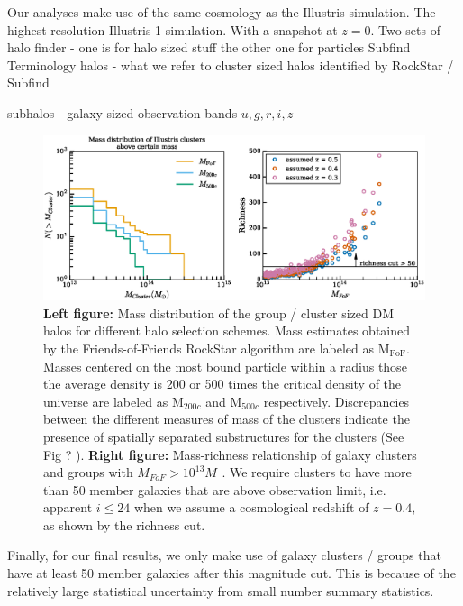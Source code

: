 \documentclass[usenatbib]{mn2e}
\begin{document}
\cite{Vogelsberger2014}

Our analyses make use of the same cosmology as the Illustris simulation.
The highest resolution Illustris-1 simulation. 
With a snapshot at $z=0$. 
Two sets of halo finder - one is for halo sized stuff 
the other one for particles Subfind 
Terminology 
halos - what we refer to cluster sized halos identified by RockStar  / Subfind 

subhalos - galaxy sized  
observation bands $u, g, r, i, z$



\begin{figure}
	\includegraphics[width=\linewidth]{./figures/finalized/clusterMassDist.eps}
	\caption{ {\bf Left figure:} Mass distribution of the group / cluster sized DM halos
		for different halo selection schemes. Mass estimates obtained by the
		Friends-of-Friends RockStar algorithm are labeled as  M$_{\text{FoF}}$.
		Masses centered on the most bound particle within a radius those the 
		average density is 200 or 500 times the critical density of the universe are 
		labeled as M$_{200c}$ and M$_{500c}$ respectively. 
		Discrepancies between the different
		measures of mass of the clusters indicate the presence of spatially
		separated substructures for the clusters (See Fig ? ). {\bf Right figure:} Mass-richness
		relationship of galaxy clusters and groups with $M_{FoF} > 10^{13} M_{}$ . We require clusters to have more than 50 member galaxies that
	are above observation limit, i.e. apparent $i \leq 24$ when we assume a cosmological redshift
of $z=0.4$, as shown by the richness cut. \label{fig:mass_richness}}

\end{figure}

Finally, for our final results, we only make use of galaxy clusters / groups 
that have at least 50 member galaxies after this magnitude cut. This is because
of the relatively large statistical uncertainty from small number summary
statistics. 
\end{document}
